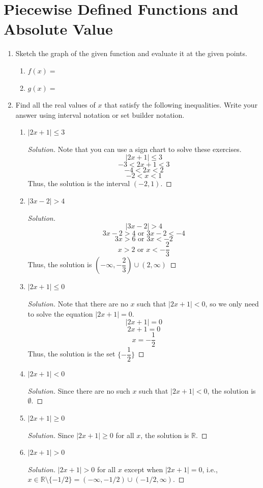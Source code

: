 \documentclass[12pt]{article}
\newenvironment{solution}{\begin{proof}[Solution]}{\end{proof}}
\begin{document}
			\section{Piecewise Defined Functions and Absolute Value}
		\begin{enumerate}
			\item Sketch the graph of the given function and evaluate it at the given points.
			\begin{enumerate}
				\item $f(x)=$
				\item $g(x)=$
			\end{enumerate}
			\item Find all the real values of $x$ that satisfy the following inequalities. Write your answer using interval notation or set builder notation.
			\begin{enumerate}
				\item $\left| 2x+1\right|\leq 3$
				\begin{solution}
					Note that you can use a sign chart to solve these exercises. 
					$$\left| 2x+1\right|\leq 3$$
					$$-3<2x+1<3$$
					$$-4<2x<2$$
					$$-2<x<1$$
					Thus, the solution is the interval $(-2,1)$.
				\end{solution}
				\item $\left|3x-2\right|>4$
				\begin{solution}
					$$\left|3x-2\right|>4$$
					$$3x-2>4 \text{ or } 3x-2<-4$$
					$$3x>6 \text{ or } 3x<-2$$
					$$x>2 \text{ or } x<-\dfrac{2}{3}$$
					Thus, the solution is $(-\infty,-\dfrac{2}{3})\cup(2,\infty)$
				\end{solution}
				\item $\left| 2x+1\right|\leq 0$
				\begin{solution}
					Note that there are no $x$ such that $|2x+1|<0$, so we only need to solve the equation $|2x+1|=0$. 
					$$|2x+1|=0$$
					$$2x+1=0$$
					$$x=-\dfrac{1}{2}$$
					Thus, the solution is the set $\{-\dfrac{1}{2}\}$
				\end{solution}
				\item $\left| 2x+1\right|< 0$
				\begin{solution}
					Since there are no such $x$ such that $|2x+1|<0$, the solution is $\emptyset$.
				\end{solution}
				\item $\left| 2x+1\right|\geq 0$
				\begin{solution}
					Since $|2x+1|\geq0$ for all $x$, the solution is $\mathbb{R}$.
				\end{solution}
				\item $\left| 2x+1\right|>0$
				\begin{solution}
					$|2x+1|>0$ for all $x$ except when $|2x+1|=0$, i.e., $x\in\mathbb{R} \setminus \{-1/2\}=(-\infty,-1/2)\cup(-1/2,\infty)$.
				\end{solution}
			\end{enumerate}
			

\end{enumerate}
\end{document}
